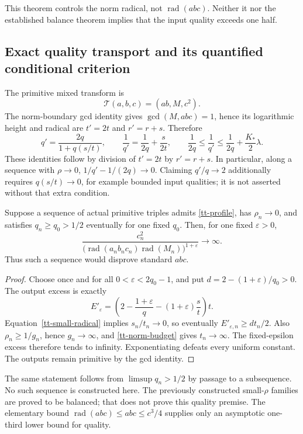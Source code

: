 This theorem controls the norm radical, not $\operatorname{rad}(abc)$.
Neither it nor the established balance theorem implies that the input quality
exceeds one half.

\subsection{Exact quality transport and its quantified conditional criterion}
The primitive mixed transform is
\[
 \mathcal T(a,b,c)=(ab,M,c^2).
\]
The norm-boundary gcd identity gives
$\gcd(M,abc)=1$, hence its logarithmic height and radical are
$t'=2t$ and $r'=r+s$. Therefore
\begin{equation}\label{tt-quality}
 q'=\frac{2q}{1+q(s/t)},\qquad
 \frac1{q'}=\frac1{2q}+\frac{s}{2t},\qquad
 \frac1{2q}\le\frac1{q'}\le\frac1{2q}+\frac{K_*}2\lambda.
\end{equation}
These identities follow by division of $t'=2t$ by $r'=r+s$.
In particular, along a sequence with $\rho\to0$,
$1/q'-1/(2q)\to0$. Claiming $q'/q\to2$ additionally requires
$q(s/t)\to0$, for example bounded input qualities; it is not asserted
without that extra condition.

\begin{theorem}\label{tt-half-quality}
Suppose a sequence of actual primitive triples admits
\eqref{tt-profile}, has $\rho_n\to0$, and satisfies
$q_n\ge q_0>1/2$ eventually for one fixed $q_0$. Then, for one fixed
$\varepsilon>0$,
\[
 \frac{c_n^2}
 {\bigl(\operatorname{rad}(a_nb_nc_n)\operatorname{rad}(M_n)\bigr)^{1+\varepsilon}}
 \longrightarrow\infty.
\]
Thus such a sequence would disprove standard $abc$.
\end{theorem}
\begin{proof}
Choose once and for all $0<\varepsilon<2q_0-1$, and put
$d=2-(1+\varepsilon)/q_0>0$. The output excess is exactly
\[
 E'_\varepsilon
 =\left(2-\frac{1+\varepsilon}{q}
          -(1+\varepsilon)\frac{s}{t}\right)t.
\]
Equation~\eqref{tt-small-radical} implies $s_n/t_n\to0$, so eventually
$E'_{\varepsilon,n}\ge dt_n/2$. Also $\rho_n\ge1/g_n$, hence
$g_n\to\infty$, and \eqref{tt-norm-budget} gives $t_n\to\infty$.
The fixed-epsilon excess therefore tends to infinity. Exponentiating defeats
every uniform constant. The outputs remain primitive by the gcd identity.
\end{proof}

The same statement follows from $\limsup q_n>1/2$ by passage to a
subsequence. No such sequence is constructed here. The previously constructed
small-$\rho$ families are proved to be balanced; that does not prove this
quality premise. The elementary bound
$\operatorname{rad}(abc)\le abc\le c^3/4$ supplies only an asymptotic
one-third lower bound for quality.

